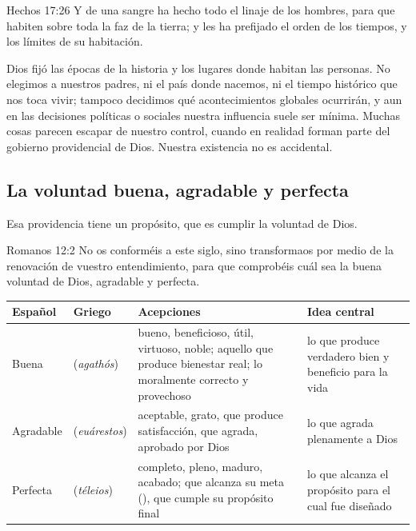 \begin{verso}{Hechos 17:26}
Y de una sangre ha hecho todo el linaje de los hombres, para que habiten sobre toda la faz de la tierra; y les ha prefijado el orden de los tiempos, y los límites de su habitación.
\end{verso}

Dios fijó las épocas de la historia y los lugares donde habitan las personas. No elegimos a nuestros padres, ni el país donde nacemos, ni el tiempo histórico que nos toca vivir; tampoco decidimos qué acontecimientos globales ocurrirán, y aun en las decisiones políticas o sociales nuestra influencia suele ser mínima. Muchas cosas parecen escapar de nuestro control, cuando en realidad forman parte del gobierno providencial de Dios. Nuestra existencia no es accidental.

\subsection{La voluntad buena, agradable y perfecta}

Esa providencia tiene un propósito, que es cumplir la voluntad de Dios.

\begin{verso}{Romanos 12:2}
No os conforméis a este siglo, sino transformaos por medio de la renovación de vuestro entendimiento, para que comprobéis cuál sea la buena voluntad de Dios, agradable y perfecta.
\end{verso}

\begin{center}\small\renewcommand{\arraystretch}{1.25}
\begin{tabular}{@{}L{1.8cm}L{2.6cm}L{6.0cm}L{4.0cm}@{}}
\toprule
\textbf{Español} & \textbf{Griego} & \textbf{Acepciones} & \textbf{Idea central} \\ \midrule
Buena &  (\emph{agathós}) & bueno, beneficioso, útil, virtuoso, noble; aquello que produce bienestar real; lo moralmente correcto y provechoso & lo que produce verdadero bien y beneficio para la vida \\
Agradable &  (\emph{euárestos}) & aceptable, grato, que produce satisfacción, que agrada, aprobado por Dios & lo que agrada plenamente a Dios \\
Perfecta &  (\emph{téleios}) & completo, pleno, maduro, acabado; que alcanza su meta (), que cumple su propósito final & lo que alcanza el propósito para el cual fue diseñado \\
\bottomrule
\end{tabular}\end{center}

